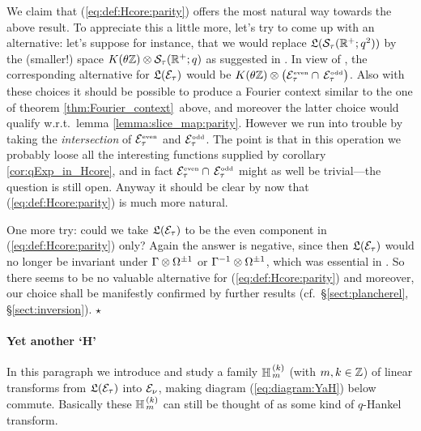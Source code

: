 \begin{remark} \rm
We claim that (\ref{eq:def:Hcore:parity}) offers the most natural way towards the above result.
To appreciate this a little more, let's try to come up with an alternative:
let's suppose for instance, that we would replace
$\mathfrak{L}({\mathcal S}_\tau(\mathbb{R}^+;q^2))$ by the (smaller!) space
$K(\theta \mathbb{Z}) \otimes {\mathcal S}_\tau (\mathbb{R}^+;q)$
as suggested in \mbox{\cite[remark 3.4.1.3.iii]{Jeroen:QE2:haar}}\@.
In view of \mbox{\cite[equation (27)]{Jeroen:QE2:haar}},
the corresponding alternative for $\mathfrak{L}(\mathcal E_\tau)$ would be
$\KZ \tens \left(\Hcore_\tau^\scripteven \cap \,\Hcore_\tau^\scriptodd \vertM \right)$.
Also with these choices it should be possible to produce a Fourier context
similar to the one of theorem \ref{thm:Fourier_context}\ above,
and moreover the latter choice would qualify w.r.t.\ lemma \ref{lemma:slice_map:parity}\@.
However we run into trouble by taking the {\em intersection\/} of
$\mathcal E_\tau^{\rm \scriptscriptstyle even}$ and $\mathcal E_\tau^{\rm \scriptscriptstyle odd}$.
The point is that in this operation we probably loose all the interesting
functions supplied by corollary \ref{cor:qExp_in_Hcore}, and in fact
$\mathcal E_\tau^{\rm \scriptscriptstyle even} \cap \, \mathcal E_\tau^{\rm \scriptscriptstyle odd} $ might as well be
trivial---the question is still open. Anyway it should be clear by
now that (\ref{eq:def:Hcore:parity}) is much more natural.

One more try: could we take $\mathfrak{L}(\mathcal E_\tau)$ to be the even
component in (\ref{eq:def:Hcore:parity}) only? Again the answer is
negative, since then $\mathfrak{L}(\mathcal E_\tau)$ would no longer be invariant under
$\Gamma \otimes \Omega^{\pm 1}$ or $\Gamma^{-1} \otimes \Omega^{\pm 1}$,
which was essential in \mbox{\cite[proposition 3.3.1.1]{Jeroen:QE2:haar}}\@.
So there seems to be no valuable alternative for (\ref{eq:def:Hcore:parity}) and
moreover, our choice shall be manifestly confirmed by further results
(cf.\ \S\ref{sect:plancherel}, \S\ref{sect:inversion}).
\hfill $\star$
\end{remark}




\paragraph{Yet another \lq H\rq}
In this paragraph we introduce and study a family $\mathbb{H}_{\,m}^{\,(k)}$ (with $m,k\in\mathbb{Z}$)
of linear transforms from $\mathfrak{L}(\mathcal E_\tau)$ into $\mathcal E_\nu$,
making diagram (\ref{eq:diagram:YaH}) below commute. Basically these
$\mathbb{H}_{\,m}^{\,(k)}$ can still be thought of as some kind of $q$-Hankel transform.

